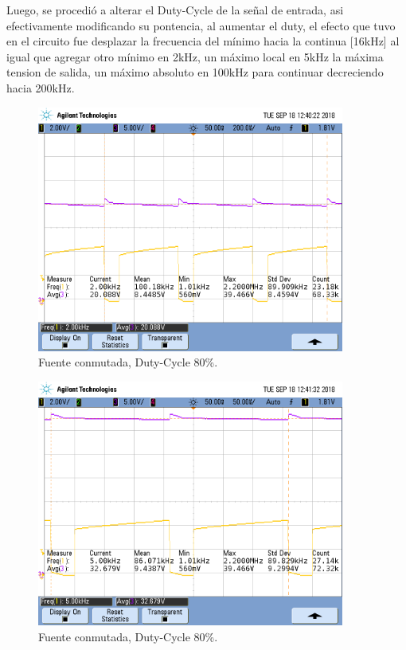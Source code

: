 Luego, se procedió a alterar el Duty-Cycle de la señal de entrada, asi efectivamente modificando su pontencia, al aumentar el duty,  el efecto que tuvo en el circuito fue desplazar la frecuencia del mínimo hacia la continua [16kHz] al igual que agregar otro mínimo en 2kHz, un máximo local en 5kHz  la máxima tension de salida, un máximo absoluto en 100kHz  para continuar decreciendo hacia 200kHz. 
\begin{figure}[H]
	\centering
	\includegraphics[width=0.9\textwidth]{Imagenes/dc_80.png}
\caption{Fuente conmutada, Duty-Cycle 80\%.}
	\label{fig:fcon}
\end{figure}
\begin{figure}[H]
	\centering
	\includegraphics[width=0.9\textwidth]{Imagenes/dc_81.png}
\caption{Fuente conmutada, Duty-Cycle 80\%.}
	\label{fig:fcon}
\end{figure}
